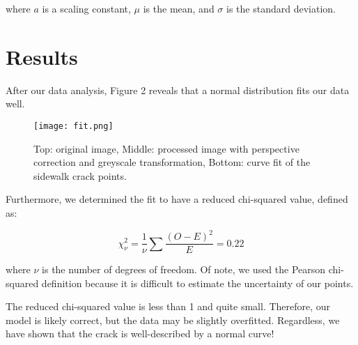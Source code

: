 \documentclass{article}
\begin{document}
where \( a \) is a scaling constant, \( \mu \) is the mean, and \( \sigma \) is the standard deviation.
\section{Results}

After our data analysis, Figure 2 reveals that a normal distribution fits our data well.

\begin{figure}[h]
    \centering
    \texttt{[image: fit.png]} 
    \caption{Top: original image, Middle: processed image with perspective correction and greyscale transformation, Bottom: curve fit of the sidewalk crack points.}
\end{figure}


Furthermore, we determined the fit to have a reduced chi-squared value, defined as:

\begin{equation}
    \chi^2_\nu = \frac{1}{\nu} \sum \frac{(O - E)^2}{E} = 0.22
\end{equation}

where \( \nu \) is the number of degrees of freedom. Of note, we used the Pearson chi-squared definition because it is difficult to estimate the uncertainty of our points.

The reduced chi-squared value is less than 1 and quite small. Therefore, our model is likely correct, but the data may be slightly overfitted. Regardless, we have shown that the crack is well-described by a normal curve!


\nocite{*}
\end{document}
